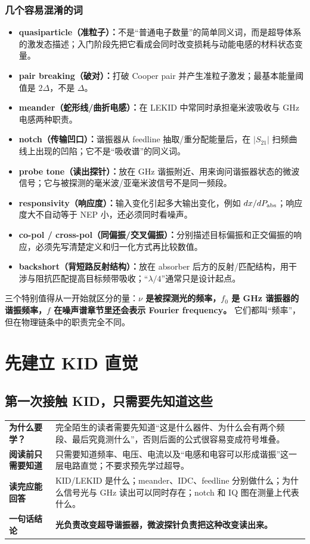 \documentclass[11pt,a4paper,openany]{ctexrep}
\newcommand{\chapterguide}[4]{%
\begin{tcolorbox}[
  enhanced,
  breakable,
  colback=KidGray!45,
  colframe=KidBlue!65,
  boxrule=0.8pt,
  arc=2mm,
  title=本章导航,
  fonttitle=\bfseries,
  before skip=0.7em,
  after skip=1.0em]
\renewcommand{\arraystretch}{1.18}
\noindent\begin{tabularx}{\textwidth}{>{\bfseries\color{KidBlue}}p{3.0cm} X}
为什么要学？ & #1 \\
阅读前只需要知道 & #2 \\
读完应能回答 & #3 \\
一句话结论 & \textbf{#4} \\
\end{tabularx}
\end{tcolorbox}%
}
\begin{document}
\section*{几个容易混淆的词}
\begin{itemize}
  \item \textbf{quasiparticle（准粒子）：}不是“普通电子数量”的简单同义词，而是超导体系的激发态描述；入门阶段先把它看成会同时改变损耗与动能电感的材料状态变量。
  \item \textbf{pair breaking（破对）：}打破 Cooper pair 并产生准粒子激发；最基本能量阈值是 $2\Delta$，不是 $\Delta$。
  \item \textbf{meander（蛇形线/曲折电感）：}在 LEKID 中常同时承担毫米波吸收与 GHz 电感两种职责。
  \item \textbf{notch（传输凹口）：}谐振器从 feedline 抽取/重分配能量后，在 $|S_{21}|$ 扫频曲线上出现的凹陷；它不是“吸收谱”的同义词。
  \item \textbf{probe tone（读出探针）：}放在 GHz 谐振附近、用来询问谐振器状态的微波信号；它与被探测的毫米波/亚毫米波信号不是同一频段。
  \item \textbf{responsivity（响应度）：}输入变化引起多大输出变化，例如 $dx/dP_{\rm abs}$；响应度大不自动等于 NEP 小，还必须同时看噪声。
  \item \textbf{co-pol / cross-pol（同偏振/交叉偏振）：}分别描述目标偏振和正交偏振的响应，必须先写清楚定义和归一化方式再比较数值。
  \item \textbf{backshort（背短路反射结构）：}放在 absorber 后方的反射/匹配结构，用干涉与阻抗匹配提高目标频带吸收；“$\lambda/4$”通常只是设计起点。
\end{itemize}

\begin{checkpointbox}
三个特别值得从一开始就区分的量：\textbf{$\nu$ 是被探测光的频率，$f_0$ 是 GHz 谐振器的谐振频率，$f$ 在噪声谱章节里还会表示 Fourier frequency。} 它们都叫“频率”，但在物理链条中的职责完全不同。
\end{checkpointbox}

\part{先建立 KID 直觉}
\setcounter{chapter}{-1}
\chapter{第一次接触 KID，只需要先知道这些}
\chapterguide
{完全陌生的读者需要先知道“这是什么器件、为什么会有两个频段、最后究竟测什么”，否则后面的公式很容易变成符号堆叠。}
{只需要知道频率、电压、电流以及“电感和电容可以形成谐振”这一层电路直觉；不要求预先学过超导。}
{KID/LEKID 是什么；meander、IDC、feedline 分别做什么；为什么信号光与 GHz 读出可以同时存在；notch 和 IQ 图在测量上代表什么。}
{光负责改变超导谐振器，微波探针负责把这种改变读出来。}
\end{document}
